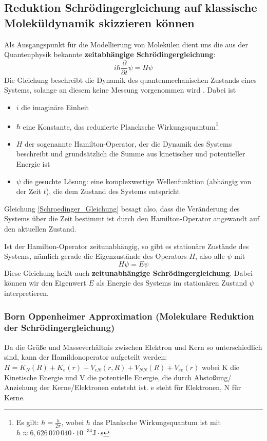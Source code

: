 \documentclass[]{article}
\begin{document}
\subsection*{Reduktion Schrödingergleichung auf klassische Moleküldynamik skizzieren können}
Als Ausgangspunkt für die Modellierung von Molekülen dient uns die aus der Quantenphysik bekannte \textbf{zeitabhängige Schrödingergleichung}:
\begin{equation}
i \hbar \frac{\partial }{\partial t} \psi = H \psi \label{Schroedinger_Gleichung}
\end{equation}
Die Gleichung beschreibt die Dynamik des quantenmechanischen Zustands eines Systems, solange an diesem keine Messung vorgenommen wird \cite{wikSchroedGl}. Dabei ist
\begin{itemize}
	\item $i$ die imaginäre Einheit
	\item $\hbar$ eine Konstante, das reduzierte Plancksche Wirkungsquantum\footnote{Es gilt: $\hbar = \frac{h}{2 \pi}$, wobei $h$ das Planksche Wirkungsquantum ist mit $h \approx  	6{,}626\,070\,040 \cdot 10^{-34} \mathrm{J \cdot s}$}
	\item $H$ der sogenannte Hamilton-Operator, der die Dynamik des Systems beschreibt und grundsätzlich die Summe aus kinetischer und potentieller Energie ist
	\item $\psi$ die gesuchte Lösung: eine komplexwertige Wellenfunktion (abhängig von der Zeit $t$), die dem Zustand des Systems entspricht
\end{itemize}
Gleichung \eqref{Schroedinger_Gleichung} besagt also, dass die Veränderung des Systems über die Zeit bestimmt ist durch den Hamilton-Operator angewandt auf den aktuellen Zustand.

Ist der Hamilton-Operator zeitunabhängig, so gibt es stationäre Zustände des Systems, nämlich gerade die Eigenzustände des Operators $H$, also alle $\psi$ mit
\begin{equation}
H \psi = E \psi \label{Schroedinger_Gleichung_zeitunab}
\end{equation}
Diese Gleichung heißt auch \textbf{zeitunabhängige Schrödingergleichung}.
Dabei können wir den Eigenwert $E$ als Energie des Systems im stationären Zustand $\psi$ interpretieren.

\subsubsection*{Born Oppenheimer Approximation (Molekulare Reduktion der Schrödingergleichung)}
Da die Größe und Masseverhältnis zwischen Elektron und Kern so unterschiedlich sind, kann der Hamildonoperator aufgeteilt werden: $H = K_N(R) + K_e(r) + V_{eN} (r,R) + V_{NN}(R) + V_{ee} (r)$ wobei K die Kinetische Energie und V die potentielle Energie, die durch Abstoßung/ Anziehung der Kerne/Elektronen entsteht ist. e steht für Elektronen, N für Kerne. 
\end{document}
